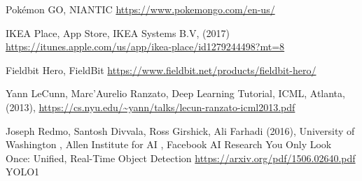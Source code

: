 \begin{thebibliography}{X}
Pokémon GO, NIANTIC
\url{https://www.pokemongo.com/en-us/}


IKEA Place, App Store, IKEA Systems B.V, (2017)
\url{https://itunes.apple.com/us/app/ikea-place/id1279244498?mt=8}

Fieldbit Hero, FieldBit
\url{https://www.fieldbit.net/products/fieldbit-hero/}

Yann LeCunn, Marc'Aurelio Ranzato, Deep Learning Tutorial, ICML, Atlanta, (2013), 
\url{https://cs.nyu.edu/~yann/talks/lecun-ranzato-icml2013.pdf}

Joseph Redmo, Santosh Divvala, Ross Girshick, Ali Farhadi (2016), University of Washington
, Allen Institute for AI
, Facebook AI Research
You Only Look Once: Unified, Real-Time Object Detection
\url{https://arxiv.org/pdf/1506.02640.pdf} YOLO1


\end{thebibliography}
